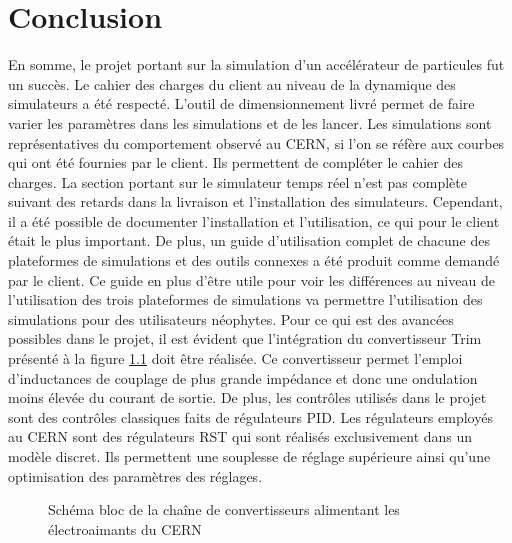 \chapter{Conclusion}
En somme, le projet portant sur la simulation d'un accélérateur de particules fut un succès. Le cahier des charges du client au niveau de la dynamique des simulateurs a été respecté. L'outil de dimensionnement livré permet de faire varier les paramètres dans les simulations et de les lancer. Les simulations sont représentatives du comportement observé au CERN, si l'on se réfère aux courbes qui ont été fournies par le client. Ils permettent de compléter le cahier des charges. La section portant sur le simulateur temps réel n'est pas complète suivant des retards dans la livraison et l'installation des simulateurs. Cependant, il a été possible de documenter l'installation et l'utilisation, ce qui pour le client était le plus important. De plus, un guide d'utilisation complet de chacune des plateformes de simulations et des outils connexes a été produit comme demandé par le client. Ce guide en plus d'être utile pour voir les différences au niveau de l'utilisation des trois plateformes de simulations va permettre l'utilisation des simulations pour des utilisateurs néophytes. Pour ce qui est des avancées possibles dans le projet, il est évident que l'intégration du convertisseur \og Trim \fg{} présenté à la figure \ref{conv_CERN} doit être réalisée. Ce convertisseur permet l'emploi d'inductances de couplage de plus grande impédance et donc une ondulation moins élevée du courant de sortie. De plus, les contrôles utilisés dans le projet sont des contrôles classiques faits de régulateurs PID. Les régulateurs employés au CERN sont des régulateurs RST qui sont réalisés exclusivement dans un modèle discret. Ils permettent une souplesse de réglage supérieure ainsi qu'une optimisation des paramètres des réglages.


\begin{figure}[htb]
\centering
{}
\caption{Schéma bloc de la chaîne de convertisseurs alimentant les électroaimants du CERN}
\label{conv_CERN}
\end{figure}

